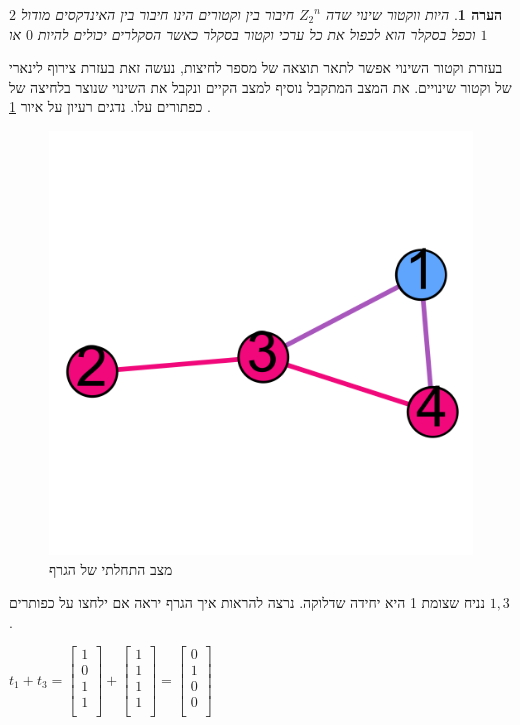 \documentclass[12pt,leqno]{article}
\newtheorem{comm}{הערה}[section]
\newcommand{\Zn}{{Z_2}^n}
\begin{document}

\begin{comm}
    היות ווקטור שינוי שדה
    $\Zn$
    חיבור בין וקטורים הינו חיבור בין האינדקסים מודול 
    $2$
    וכפל בסקלר
    הוא לכפול את כל ערכי וקטור בסקלר
    כאשר הסקלרים יכולים להיות
    $0$
    או 
    $1$
\end{comm}

בעזרת וקטור השינוי אפשר לתאר תוצאה של מספר לחיצות,
נעשה זאת בעזרת צירוף לינארי של וקטור שינויים.
את המצב המתקבל נוסיף למצב הקיים ונקבל את השינוי שנוצר בלחיצה של כפתורים
עלו.
נדגים רעיון על איור
\ref{fig:start graph presses}
.

\begin{figure}[ht]
    \caption{מצב התחלתי של הגרף}
    \label{fig:start graph presses}
    \centering
    \includegraphics[width=.7\textwidth,keepaspectratio]{images/graph_presses.png}
\end{figure}

נניח שצומת 1 היא יחידה שדלוקה.
נרצה להראות איך הגרף יראה אם ילחצו על כפותרים 
$1, 3$.

$
    t_1 + t_3 = 
    \begin{bmatrix}
        1 \\
        0 \\
        1 \\
        1 \\
    \end{bmatrix}
    +
    \begin{bmatrix}
        1 \\
        1 \\
        1 \\
        1 \\
    \end{bmatrix}
    =
    \begin{bmatrix}
        0 \\
        1 \\
        0 \\
        0 \\
    \end{bmatrix}
$
\end{document}
